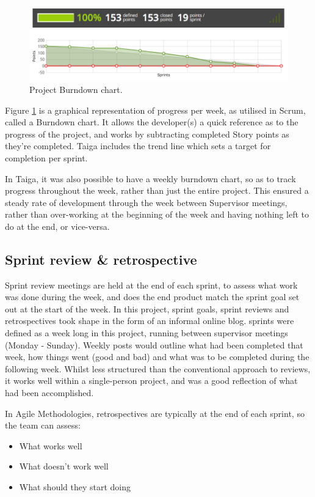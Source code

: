 \begin{figure}[H]
  \centering
  \includegraphics[width=\textwidth]{Chapter2/software-img/burndown.png}
  \caption{Project Burndown chart.}
  \label{fig:burndown}
\end{figure}

Figure \ref{fig:burndown} is a graphical representation of progress per week, as utilised in Scrum, called a Burndown chart. It allows the developer(s) a quick reference as to the progress of the project, and works by subtracting completed Story points as they're completed. Taiga includes the trend line which sets a target for completion per sprint.

In Taiga, it was also possible to have a weekly burndown chart, so as to track progress throughout the week, rather than just the entire project. This ensured a steady rate of development through the week between Supervisor meetings, rather than over-working at the beginning of the week and having nothing left to do at the end, or vice-versa.

\subsection{Sprint review \& retrospective}

Sprint review meetings are held at the end of each sprint, to assess what work was done during the week, and does the end product match the sprint goal set out at the start of the week. In this project, sprint goals, sprint reviews and retrospectives took shape in the form of an informal online blog. sprints were defined as a week long in this project, running between supervisor meetings (Monday - Sunday). Weekly posts would outline what had been completed that week, how things went (good and bad) and what was to be completed during the following week. Whilst less structured than the conventional approach to reviews, it works well within a single-person project, and was a good reflection of what had been accomplished.

In Agile Methodologies, retrospectives are typically at the end of each sprint, so the team can assess:
\begin{itemize}
  \item What works well
  \item What doesn't work well
  \item What should they start doing
\end{itemize}

